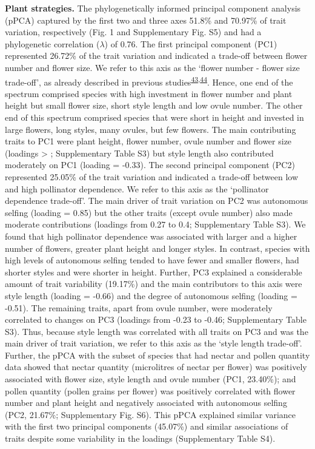\documentclass[
  12pt,
  a4paper,
]{article}
\begin{document}
\textbf{Plant strategies.} The phylogenetically informed principal component analysis (pPCA) captured by the first two and three axes 51.8\% and 70.97\% of trait variation, respectively (Fig. 1 and Supplementary Fig. S5) and had a phylogenetic correlation (\(\lambda\)) of 0.76. The first principal component (PC1) represented 26.72\% of the trait variation and indicated a trade-off between flower number and flower size. We refer to this axis as the `flower number - flower size trade-off', as already described in previous studies\textsuperscript{\protect\hyperlink{ref-sargent2007}{43},\protect\hyperlink{ref-kettle2011}{44}}. Hence, one end of the spectrum comprised species with high investment in flower number and plant height but small flower size, short style length and low ovule number. The other end of this spectrum comprised species that were short in height and invested in large flowers, long styles, many ovules, but few flowers. The main contributing traits to PC1 were plant height, flower number, ovule number and flower size (loadings \textgreater{} \textbar; Supplementary Table S3) but style length also contributed moderately on PC1 (loading = -0.33). The second principal component (PC2) represented 25.05\% of the trait variation and indicated a trade-off between low and high pollinator dependence. We refer to this axis as the `pollinator dependence trade-off'. The main driver of trait variation on PC2 was autonomous selfing (loading = 0.85) but the other traits (except ovule number) also made moderate contributions (loadings from 0.27 to 0.4; Supplementary Table S3). We found that high pollinator dependence was associated with larger and a higher number of flowers, greater plant height and longer styles. In contrast, species with high levels of autonomous selfing tended to have fewer and smaller flowers, had shorter styles and were shorter in height. Further, PC3 explained a considerable amount of trait variability (19.17\%) and the main contributors to this axis were style length (loading = -0.66) and the degree of autonomous selfing (loading = -0.51). The remaining traits, apart from ovule number, were moderately correlated to changes on PC3 (loadings from -0.23 to -0.46; Supplementary Table S3). Thus, because style length was correlated with all traits on PC3 and was the main driver of trait variation, we refer to this axis as the `style length trade-off'. Further, the pPCA with the subset of species that had nectar and pollen quantity data showed that nectar quantity (microlitres of nectar per flower) was positively associated with flower size, style length and ovule number (PC1, 23.40\%); and pollen quantity (pollen grains per flower) was positively correlated with flower number and plant height and negatively associated with autonomous selfing (PC2, 21.67\%; Supplementary Fig. S6). This pPCA explained similar variance with the first two principal components (45.07\%) and similar associations of traits despite some variability in the loadings (Supplementary Table S4).
\end{document}

